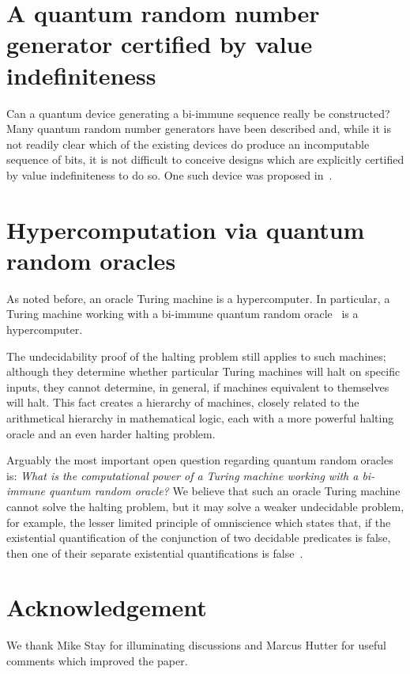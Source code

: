 \documentclass[preprint,11pt]{elsarticle}
\begin{document}
\section{A quantum random number generator certified by value indefiniteness}



Can a quantum device generating a bi-immune sequence really be constructed?
Many quantum random number generators have been described and, while it is not readily clear which of the existing devices  do produce  an incomputable sequence of bits, it is not difficult to conceive designs which are explicitly certified by value indefiniteness to do so.
One such device was proposed in~\cite{Abbott:2010fk}.




\section{Hypercomputation via quantum random oracles}
As noted before, an oracle Turing machine  is a hypercomputer. In particular, a Turing machine working with a bi-immune quantum random oracle~\cite{Abbott:2010fk} is a hypercomputer.




The undecidability proof of the halting problem still applies to such machines; although they determine whether particular Turing machines will halt on specific inputs, they cannot determine, in general, if machines equivalent to themselves will halt. This fact creates a hierarchy of machines, closely related to the arithmetical hierarchy in mathematical logic, each with a more powerful halting oracle and an even harder halting problem.

Arguably the most important open question regarding quantum random oracles is:  {\it What is the computational power of a Turing machine working with a bi-immune quantum random oracle?} We believe that such an oracle Turing machine cannot solve the halting problem, but it may solve a weaker undecidable problem, for example, the lesser limited principle of omniscience  which states that, if the existential quantification of the conjunction of two decidable predicates is false, then one of their separate existential quantifications is false~\cite{Bridges:1987vn}.

\section*{Acknowledgement}
We thank Mike Stay for illuminating discussions  and Marcus Hutter
for useful comments which improved the paper.




\end{document}
